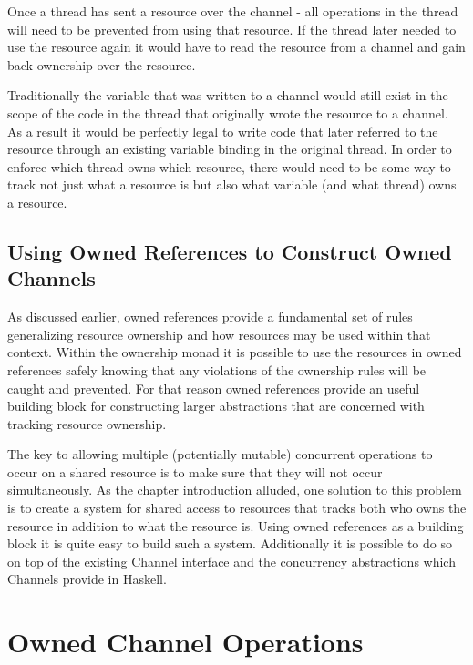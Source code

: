 \documentclass[onehalf,11pt]{beavtex}
\begin{document}
Once a thread has sent a resource over the channel - all operations in the thread
will need to be prevented from using that resource.
If the thread later needed to use the resource again it would have to read the
resource from a channel and gain back ownership over the resource.

Traditionally the variable that was written to a channel would still exist in the
scope of the code in the thread that originally wrote the resource to a channel.
As a result it would be perfectly legal to write code that later referred to the
resource through an existing variable binding in the original thread.
In order to enforce which thread owns which resource, there would need to be
some way to track not just what a resource is but also what variable (and what
thread) owns a resource.

\subsection{Using Owned References to Construct Owned Channels}

As discussed earlier, owned references provide a fundamental set of
rules generalizing resource ownership and how resources may be used within that
context.  Within the ownership monad it is possible to use the
resources in owned references safely knowing that any violations of
the ownership rules will be caught and prevented.  For that reason
owned references provide an useful building block for constructing
larger abstractions that are concerned with tracking resource ownership.

The key to allowing multiple (potentially mutable) concurrent operations to occur
on a shared resource is to make sure that they will not occur simultaneously.
As the chapter introduction alluded, one solution to this problem is to
create a system for shared access to resources that tracks both who owns the
resource in addition to what the resource is.
Using owned references as a building block it is quite easy to build
such a system. Additionally it is possible to do so on top of the existing
Channel interface and the concurrency abstractions which Channels provide in
Haskell.


\section{Owned Channel Operations}
\end{document}
